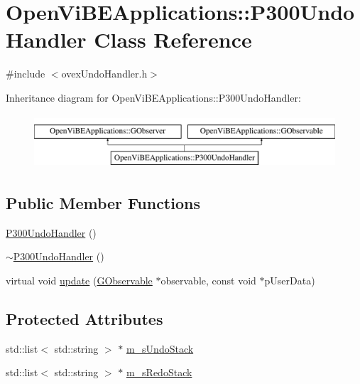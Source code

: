 \hypertarget{classOpenViBEApplications_1_1P300UndoHandler}{
\section{OpenViBEApplications::P300UndoHandler Class Reference}
\label{classOpenViBEApplications_1_1P300UndoHandler}
}


{\ttfamily \#include $<$ovexUndoHandler.h$>$}

Inheritance diagram for OpenViBEApplications::P300UndoHandler:\begin{figure}[H]
\begin{center}
\leavevmode
\includegraphics[height=2.000000cm]{classOpenViBEApplications_1_1P300UndoHandler}
\end{center}
\end{figure}
\subsection*{Public Member Functions}
\begin{DoxyCompactItemize}
\item 
\hyperlink{classOpenViBEApplications_1_1P300UndoHandler_a8b84c1393f4268f8b0db944ef9f1399b}{P300UndoHandler} ()
\item 
\hyperlink{classOpenViBEApplications_1_1P300UndoHandler_aec3328d86a7517193aa9e6d43f54c5ab}{$\sim$P300UndoHandler} ()
\item 
virtual void \hyperlink{classOpenViBEApplications_1_1P300UndoHandler_a738247ff99ffd57574e4e431a5b78007}{update} (\hyperlink{classOpenViBEApplications_1_1GObservable}{GObservable} $\ast$observable, const void $\ast$pUserData)
\end{DoxyCompactItemize}
\subsection*{Protected Attributes}
\begin{DoxyCompactItemize}
\item 
std::list$<$ std::string $>$ $\ast$ \hyperlink{classOpenViBEApplications_1_1P300UndoHandler_a79d978d7bb9e904e5500f39e32cc4341}{m\_\-sUndoStack}
\item 
std::list$<$ std::string $>$ $\ast$ \hyperlink{classOpenViBEApplications_1_1P300UndoHandler_a4db99181e46cfb670e08964d561486fa}{m\_\-sRedoStack}
\end{DoxyCompactItemize}


